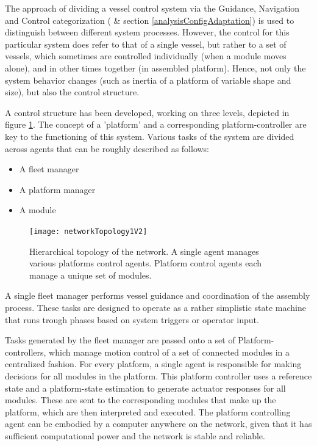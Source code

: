 The approach of dividing a vessel control system via the Guidance, Navigation and Control categorization (\citet{fossen2011handbook} \& section \ref{analysisConfigAdaptation}) is used to distinguish between different system processes. However, the control for this particular system does refer to that of a single vessel, but rather to a set of vessels, which sometimes are controlled individually (when a module moves alone), and in other times together (in assembled platform). Hence, not only the system behavior changes (such as inertia of a platform of variable shape and size), but also the control structure. 


A control structure has been developed, working on three levels, depicted in figure \ref{fig:networkTopology1}. The concept of a 'platform' and a corresponding platform-controller are key to the functioning of this system.  Various tasks of the system are divided across agents that can be roughly described as follows:

\begin{itemize}
	\item A fleet manager
	\item A platform manager
	\item A module
\end{itemize}

\begin{figure}[h]
	\centering
	\texttt{[image: networkTopology1V2]}
	\caption{Hierarchical topology of the network. A single agent manages various platforms control agents. Platform control agents each manage a unique set of modules.}
	\label{fig:networkTopology1}
\end{figure}

A single fleet manager performs vessel guidance and coordination of the assembly process. These tasks are designed to operate as a rather simplistic state machine that runs trough phases based on system triggers or operator input. 

Tasks generated by the fleet manager are passed onto a set of Platform-controllers, which manage motion control of a set of connected modules in a centralized fashion. For every platform, a single agent is responsible for making decisions for all modules in the platform. This platform controller uses a reference state and a platform-state estimation to generate actuator responses for all modules. These are sent to the corresponding modules that make up the platform, which are then interpreted and executed. The platform controlling agent can be embodied by a computer anywhere on the network, given that it has sufficient computational power and the network is stable and reliable. 

